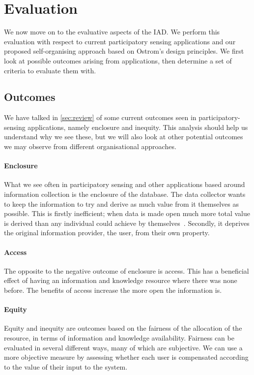 \section{Evaluation}

We now move on to the evaluative aspects of the \ac{IAD}. We perform this evaluation with respect to current participatory sensing applications and our proposed self-organising approach based on Ostrom's design principles. We first look at possible outcomes arising from applications, then determine a set of criteria to evaluate them with.

\subsection{Outcomes}

We have talked in \autoref{sec:review} of some current outcomes seen in participatory-sensing applications, namely enclosure and inequity. 
This analysis should help us understand why we see these, but we will also look at other potential outcomes we may observe from different organisational approaches. 

\paragraph{Enclosure}
What we see often in participatory sensing and other applications based around information collection is the enclosure of the database. 
The data collector wants to keep the information to try and derive as much value from it themselves as possible. 
This is firstly inefficient; when data is made open much more total value is derived than any individual could achieve by themselves~\citep{Shadbolt2012}. 
Secondly, it deprives the original information provider, the user, from their own property. 

\paragraph{Access}
The opposite to the negative outcome of enclosure is access. 
This has a beneficial effect of having an information and knowledge resource where there was none before. 
The benefits of access increase the more open the information is.

\paragraph{Equity}
Equity and inequity are outcomes based on the fairness of the allocation of the resource, in terms of information and knowledge availability. Fairness can be evaluated in several different ways, many of which are subjective. We can use a more objective measure by assessing whether each user is compensated according to the value of their input to the system. 

